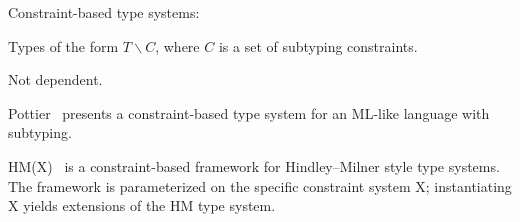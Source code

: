 Constraint-based type systems:

\cite{mitchell84}

\cite{fuh88}

\cite{curtis90}

\cite{aiken93}

\cite{jones94}

\cite{smith94}

\cite{palsberg95}

\cite{trifonov96}

        Types of the form $T\backslash C$, where $C$ is
        a set of subtyping constraints.

        Not dependent.

\cite{fahndrich99}


Pottier~\cite{pottier96simplifying,pottier01b}
presents a constraint-based type system for an ML-like language with
subtyping.


HM(X)~\cite{sulzmann97type,pottier01a,pottier-remy-attapl}
is a constraint-based framework
for Hindley--Milner style type systems.
The framework is parameterized on the specific constraint system
X; instantiating X yields extensions of the HM type system.




